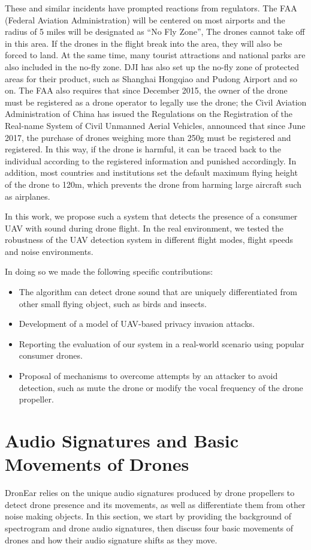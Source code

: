 \documentclass{sig-alternate-10pt}
\begin{document}
These and similar incidents have prompted reactions from regulators. The FAA (Federal Aviation Administration) will be centered on most airports and the radius of 5 miles will be designated as “No Fly Zone”, The drones cannot take off in this area. If the drones in the flight break into the area, they will also be forced to land. At the same time, many tourist attractions and national parks are also included in the no-fly zone. DJI has also set up the no-fly zone of protected areas for their product, such as Shanghai Hongqiao and Pudong Airport and so on. The FAA also requires that since December 2015, the owner of the drone must be registered as a drone operator to legally use the drone; the Civil Aviation Administration of China has issued the Regulations on the Registration of the Real-name System of Civil Unmanned Aerial Vehicles, announced that since June 2017, the purchase of drones weighing more than 250g must be registered and registered. In this way, if the drone is harmful, it can be traced back to the individual according to the registered information and punished accordingly. In addition, most countries and institutions set the default maximum flying height of the drone to 120m, which prevents the drone from harming large aircraft such as airplanes.

In this work, we propose such a system that detects the presence of a consumer UAV with sound during drone flight. In the real environment, we tested the robustness of the UAV detection system in different flight modes, flight speeds and noise environments.

In doing so we made the following specific contributions:
\begin{itemize}
\item The algorithm can detect drone sound that are uniquely differentiated from other small flying object, such as birds and insects.
\item Development of a model of UAV-based privacy invasion attacks.
\item Reporting the evaluation of our system in a real-world scenario using popular consumer drones.
\item Proposal of mechanisms to overcome attempts by an attacker to avoid detection, such as mute the drone or modify the vocal frequency of the drone propeller.
\end{itemize}
\section{ Audio Signatures and Basic Movements of Drones}
DronEar relies on the unique audio signatures produced by drone propellers to detect drone presence and its movements, as well as differentiate them from other noise making objects.  In this section, we start by providing the background of spectrogram and drone audio signatures, then discuss four basic movements of drones and how their audio signature shifts as they move.
\end{document}

